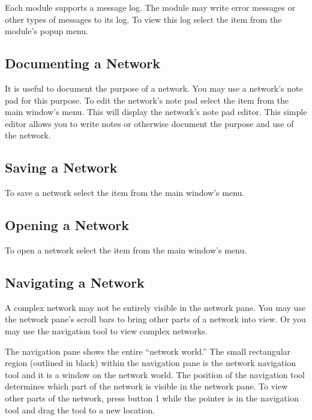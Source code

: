 Each module supports a message log.  The module may write error messages or
other types of messages to its log.  To view this log select the
 item from the module's popup menu.

\subsection{Documenting a Network}
\label{sec:docnetwork}

It is useful to document the purpose of a network.  You may use a network's
note pad for this purpose.  To edit the network's note pad select the
 item from the main window's  menu.  This
will display the network's note pad editor.  This simple editor allows you
to write notes or otherwise document the purpose and use of the network.


\subsection{Saving a Network}
\label{sec:savenet}

To save a network select the  item from the main window's
 menu.


\subsection{Opening a Network}
\label{sec:opennet}

To open a network select the  item from the main window's
 menu.


\subsection{Navigating a Network}
\label{sec:navnetwork}

A complex network may not be entirely visible in the network pane.  You may
use the network pane's scroll bars to bring other parts of a network into
view.  Or you may use the navigation tool to view complex networks.

The navigation pane shows the entire ``network world.''  The small
rectangular region (outlined in black) within the navigation pane is the
network navigation tool and it is a window on the network world.  The position of
the navigation tool determines which part of the network is visible in the
network pane.  To view other parts of the network, press button 1 while the
pointer is in the navigation tool and drag the tool to a new location.



